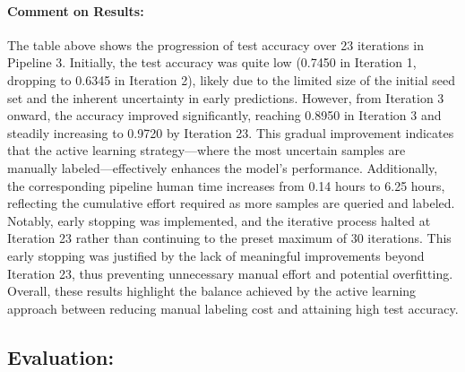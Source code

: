 \documentclass[12pt]{article}
\begin{document}
\paragraph{Comment on Results:}
The table above shows the progression of test accuracy over 23 iterations in Pipeline 3. Initially, the test accuracy was quite low (0.7450 in Iteration 1, dropping to 0.6345 in Iteration 2), likely due to the limited size of the initial seed set and the inherent uncertainty in early predictions. However, from Iteration 3 onward, the accuracy improved significantly, reaching 0.8950 in Iteration 3 and steadily increasing to 0.9720 by Iteration 23. This gradual improvement indicates that the active learning strategy—where the most uncertain samples are manually labeled—effectively enhances the model's performance. Additionally, the corresponding pipeline human time increases from 0.14 hours to 6.25 hours, reflecting the cumulative effort required as more samples are queried and labeled. Notably, early stopping was implemented, and the iterative process halted at Iteration 23 rather than continuing to the preset maximum of 30 iterations. This early stopping was justified by the lack of meaningful improvements beyond Iteration 23, thus preventing unnecessary manual effort and potential overfitting. Overall, these results highlight the balance achieved by the active learning approach between reducing manual labeling cost and attaining high test accuracy.

\subsection*{Evaluation:}
\end{document}
